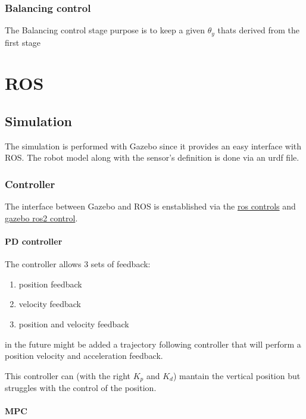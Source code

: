 \documentclass[a4paper, 7px]{article}
\begin{document}
\subsubsection{Balancing control}
The Balancing control stage purpose is to keep a given $\theta_y$ thats derived from the first stage



\section{ROS}

\subsection{Simulation}

The simulation is performed with Gazebo since it provides an easy interface with ROS.
The robot model along with the sensor's definition is done via an urdf file.

\subsubsection{Controller}
The interface between Gazebo and ROS is enstablished via the \href{https://github.com/ros-controls/ros2_control}{ros controls} 
and \href{https://github.com/ros-controls/gazebo_ros2_control}{gazebo ros2 control}.

\paragraph{PD controller}
The controller allows 3 sets of feedback:
\begin{enumerate}
	\item position feedback
	\item velocity feedback
	\item position and velocity feedback
\end{enumerate}

in the future might be added a trajectory following controller that will perform a position velocity and acceleration feedback.

This controller can (with the right $K_p$ and $K_d$) mantain the vertical position but struggles with the control of the position.

\paragraph{MPC} 
\end{document}
